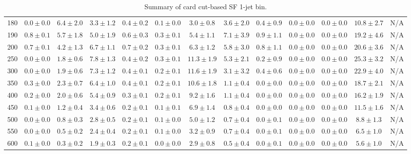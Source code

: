 \begin{table}
{\begin{center}
\begin{tabular}{l | c c | c c c c c c c c  | c c}
180 & $0.0\pm0.0$ & $6.4\pm2.0$ & $3.3\pm1.2$ & $0.4\pm0.2$ & $0.1\pm0.0$ & $3.0\pm0.8$ & $3.6\pm2.0$ & $0.4\pm0.9$ & $0.0\pm0.0$ & $0.0\pm0.0$ & $10.8\pm2.7$ & N/A \\
190 & $0.8\pm0.1$ & $5.7\pm1.8$ & $5.0\pm1.9$ & $0.6\pm0.3$ & $0.3\pm0.1$ & $5.4\pm1.1$ & $7.1\pm3.9$ & $0.9\pm1.1$ & $0.0\pm0.0$ & $0.0\pm0.0$ & $19.2\pm4.6$ & N/A \\
200 & $0.7\pm0.1$ & $4.2\pm1.3$ & $6.7\pm1.1$ & $0.7\pm0.2$ & $0.3\pm0.1$ & $6.3\pm1.2$ & $5.8\pm3.0$ & $0.8\pm1.1$ & $0.0\pm0.0$ & $0.0\pm0.0$ & $20.6\pm3.6$ & N/A \\
250 & $0.0\pm0.0$ & $1.8\pm0.6$ & $7.8\pm1.3$ & $0.4\pm0.2$ & $0.3\pm0.1$ & $11.3\pm1.9$ & $5.3\pm2.1$ & $0.2\pm0.9$ & $0.0\pm0.0$ & $0.0\pm0.0$ & $25.3\pm3.2$ & N/A \\
300 & $0.0\pm0.0$ & $1.9\pm0.6$ & $7.3\pm1.2$ & $0.4\pm0.1$ & $0.2\pm0.1$ & $11.6\pm1.9$ & $3.1\pm3.2$ & $0.4\pm0.6$ & $0.0\pm0.0$ & $0.0\pm0.0$ & $22.9\pm4.0$ & N/A \\
350 & $0.3\pm0.0$ & $2.3\pm0.7$ & $6.4\pm1.0$ & $0.4\pm0.1$ & $0.2\pm0.1$ & $10.6\pm1.8$ & $1.1\pm0.4$ & $0.0\pm0.0$ & $0.0\pm0.0$ & $0.0\pm0.0$ & $18.7\pm2.1$ & N/A \\
400 & $0.2\pm0.0$ & $2.0\pm0.6$ & $5.4\pm0.9$ & $0.3\pm0.1$ & $0.2\pm0.1$ & $9.2\pm1.6$ & $1.1\pm0.4$ & $0.0\pm0.0$ & $0.0\pm0.0$ & $0.0\pm0.0$ & $16.2\pm1.9$ & N/A \\
450 & $0.1\pm0.0$ & $1.2\pm0.4$ & $3.4\pm0.6$ & $0.2\pm0.1$ & $0.1\pm0.1$ & $6.9\pm1.4$ & $0.8\pm0.4$ & $0.0\pm0.0$ & $0.0\pm0.0$ & $0.0\pm0.0$ & $11.5\pm1.6$ & N/A \\
500 & $0.0\pm0.0$ & $0.8\pm0.3$ & $2.8\pm0.5$ & $0.2\pm0.1$ & $0.1\pm0.0$ & $5.0\pm1.2$ & $0.7\pm0.4$ & $0.0\pm0.1$ & $0.0\pm0.0$ & $0.0\pm0.0$ & $8.8\pm1.3$ & N/A \\
550 & $0.0\pm0.0$ & $0.5\pm0.2$ & $2.4\pm0.4$ & $0.2\pm0.1$ & $0.1\pm0.0$ & $3.2\pm0.9$ & $0.7\pm0.4$ & $0.0\pm0.1$ & $0.0\pm0.0$ & $0.0\pm0.0$ & $6.5\pm1.0$ & N/A \\
600 & $0.1\pm0.0$ & $0.3\pm0.2$ & $1.9\pm0.3$ & $0.2\pm0.1$ & $0.0\pm0.0$ & $2.9\pm0.8$ & $0.5\pm0.4$ & $0.0\pm0.1$ & $0.0\pm0.0$ & $0.0\pm0.0$ & $5.6\pm1.0$ & N/A \\
\hline
\end{tabular}
\end{center}
}
\caption{Summary of card cut-based SF 1-jet bin.}
\end{table}

